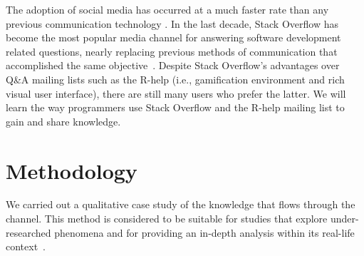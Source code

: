 \documentclass{sig-alternate-05-2015}
\begin{document}
	The adoption of social media has occurred at a much faster rate than any previous communication technology \cite{Chui2012}.
	In the last decade, Stack Overflow has become the most popular media channel for answering software development related questions, nearly replacing previous methods of communication that accomplished the same objective~\cite{Vasilescu2014c}.
	Despite Stack Overflow's advantages over Q\&A mailing lists such as the R-help (i.e., gamification environment and rich visual user interface), there are still many users who prefer the latter.
	We will learn the way programmers use Stack Overflow and the R-help mailing list to gain and share knowledge.



\section{Methodology}
\label{cha:methodology}

    We carried out a qualitative case study of the knowledge that flows through the channel. 
    This method is considered to be suitable for studies that explore under-researched phenomena and for providing an in-depth analysis within its real-life context~\cite{Yin2009}.
\end{document}
